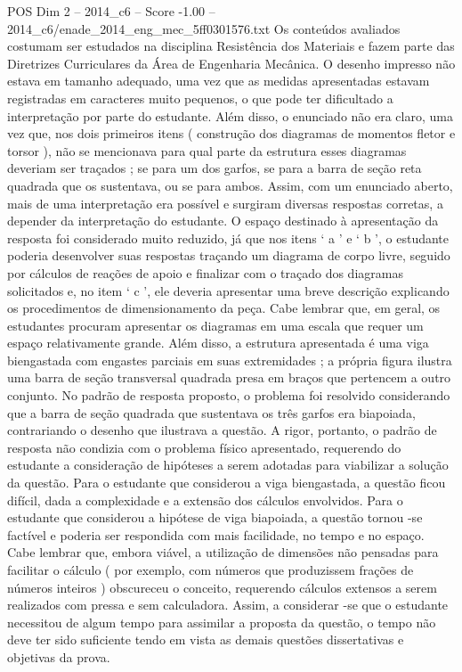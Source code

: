 \begin{textsample}{POS Dim 2 – 2014\_c6 – Score -1.00 – 2014\_c6/enade\_2014\_eng\_mec\_5ff0301576.txt}
Os conteúdos avaliados costumam ser estudados na disciplina Resistência dos Materiais e fazem parte das Diretrizes Curriculares da Área de Engenharia Mecânica.
O desenho impresso não estava em tamanho adequado, uma vez que as medidas apresentadas estavam registradas em caracteres muito pequenos, o que pode ter dificultado a interpretação por parte do estudante.
Além disso, o enunciado não era claro, uma vez que, nos dois primeiros itens ( construção dos diagramas de momentos fletor e torsor ), não se mencionava para qual parte da estrutura esses diagramas deveriam ser traçados ; se para um dos garfos, se para a barra de seção reta quadrada que os sustentava, ou se para ambos.
Assim, com um enunciado aberto, mais de uma interpretação era possível e surgiram diversas respostas corretas, a depender da interpretação do estudante.
O espaço destinado à apresentação da resposta foi considerado muito reduzido, já que nos itens ‘ a ’ e ‘ b ’, o estudante poderia desenvolver suas respostas traçando um diagrama de corpo livre, seguido por cálculos de reações de apoio e finalizar com o traçado dos diagramas solicitados e, no item ‘ c ’, ele deveria apresentar uma breve descrição explicando os procedimentos de dimensionamento da peça.
Cabe lembrar que, em geral, os estudantes procuram apresentar os diagramas em uma escala que requer um espaço relativamente grande.
Além disso, a estrutura apresentada é uma viga biengastada com engastes parciais em suas extremidades ; a própria figura ilustra uma barra de seção transversal quadrada presa em braços que pertencem a outro conjunto.
No padrão de resposta proposto, o problema foi resolvido considerando que a barra de seção quadrada que sustentava os três garfos era biapoiada, contrariando o desenho que ilustrava a questão.
A rigor, portanto, o padrão de resposta não condizia com o problema físico apresentado, requerendo do estudante a consideração de hipóteses a serem adotadas para viabilizar a solução da questão.
Para o estudante que considerou a viga biengastada, a questão ficou difícil, dada a complexidade e a extensão dos cálculos envolvidos.
Para o estudante que considerou a hipótese de viga biapoiada, a questão tornou -se factível e poderia ser respondida com mais facilidade, no tempo e no espaço.
Cabe lembrar que, embora viável, a utilização de dimensões não pensadas para facilitar o cálculo ( por exemplo, com números que produzissem frações de números inteiros ) obscureceu o conceito, requerendo cálculos extensos a serem realizados com pressa e sem calculadora.
Assim, a considerar -se que o estudante necessitou de algum tempo para assimilar a proposta da questão, o tempo não deve ter sido suficiente tendo em vista as demais questões dissertativas e objetivas da prova.

\end{textsample}
